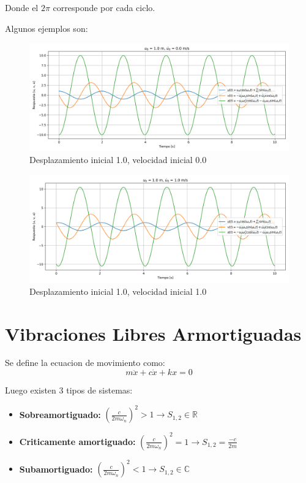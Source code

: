 \documentclass{article}  %
\begin{document}
Donde el $2\pi$ corresponde por cada ciclo.

Algunos ejemplos son:

\begin{figure}[H]
    \centering
    \includegraphics[width=1\textwidth]{GRAFICOS/sis_no_amortiguado_u0_1.0_v0_0.0.png}
    \caption{Desplazamiento inicial 1.0, velocidad inicial 0.0}
    \label{fig:ejemplo1}
\end{figure}

\begin{figure}[H]
    \centering
    \includegraphics[width=1\textwidth]{GRAFICOS/sis_no_amortiguado_u0_1.0_v0_1.0.png}
    \caption{Desplazamiento inicial 1.0, velocidad inicial 1.0}
    \label{fig:ejemplo1}
\end{figure}

\newpage
\section{Vibraciones Libres Armortiguadas}

Se define la ecuacion de movimiento como:
\begin{equation}
    m \ddot{x} + c \dot{x} + kx = 0
\end{equation}

Luego existen 3 tipos de sistemas:
\begin{itemize}
    \item \textbf{Sobreamortiguado:} $(\frac{c}{2m\omega_n})^2 > 1 \rightarrow S_{1,2} \in \mathbb{R}$ 
    \item \textbf{Criticamente amortiguado:} $(\frac{c}{2m\omega_n})^2 = 1  \rightarrow S_{1,2} = \frac{-c}{2m}$
    \item \textbf{Subamortiguado:} $(\frac{c}{2m\omega_n})^2 < 1 \rightarrow S_{1,2} \in \mathbb{C}$
\end{itemize}
\end{document}

